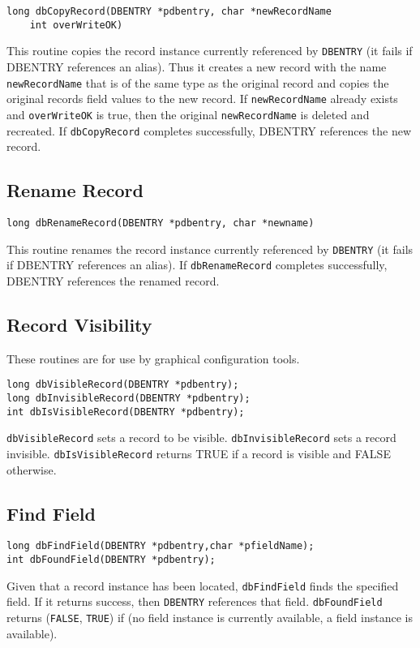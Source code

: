 \begin{verbatim}long dbCopyRecord(DBENTRY *pdbentry, char *newRecordName
    int overWriteOK)
\end{verbatim}This routine copies the record instance currently referenced by \verb|DBENTRY| (it fails if DBENTRY references an alias). Thus 
it creates a new record with the name \verb|newRecordName| that is of the same type as the original record and copies the 
original records field values to the new record. If \verb|newRecordName| already exists and \verb|overWriteOK| is true, then the 
original \verb|newRecordName| is deleted and recreated. If \verb|dbCopyRecord| completes successfully, DBENTRY references 
the new record.

\subsection{Rename Record}

\begin{verbatim}long dbRenameRecord(DBENTRY *pdbentry, char *newname)
\end{verbatim}This routine renames the record instance currently referenced by \verb|DBENTRY| (it fails if DBENTRY references an alias). If 
\verb|dbRenameRecord| completes successfully, DBENTRY references the renamed record.

\subsection{Record Visibility}

These routines are for use by graphical configuration tools.

\begin{verbatim}long dbVisibleRecord(DBENTRY *pdbentry);
long dbInvisibleRecord(DBENTRY *pdbentry);
int dbIsVisibleRecord(DBENTRY *pdbentry);
\end{verbatim}
\verb|dbVisibleRecord| sets a record to be visible. \verb|dbInvisibleRecord| sets a record invisible. 
\verb|dbIsVisibleRecord| returns TRUE if a record is visible and FALSE otherwise.

\subsection{Find Field}

\begin{verbatim}long dbFindField(DBENTRY *pdbentry,char *pfieldName);
int dbFoundField(DBENTRY *pdbentry);

\end{verbatim}
Given that a record instance has been located, \verb|dbFindField| finds the specified field. If it returns success, then 
\verb|DBENTRY| references that field. \verb|dbFoundField| returns (\verb|FALSE|, \verb|TRUE|) if (no field instance is currently available, a 
field instance is available).

